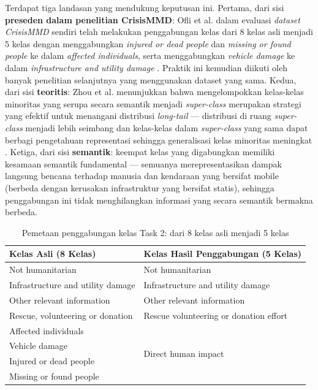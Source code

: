 Terdapat tiga landasan yang mendukung keputusan ini. Pertama, dari
sisi \textbf{preseden dalam penelitian CrisisMMD}: Ofli et al. dalam
evaluasi \textit{dataset} \textit{CrisisMMD} sendiri telah melakukan
penggabungan kelas dari 8 kelas asli menjadi 5 kelas dengan
menggabungkan \textit{injured or dead people} dan \textit{missing or
found people} ke dalam \textit{affected individuals}, serta
menggabungkan \textit{vehicle damage} ke dalam \textit{infrastructure
and utility damage} \cite{ofli2020analysis}. Praktik ini kemudian
diikuti oleh banyak penelitian selanjutnya yang menggunakan dataset
yang sama. Kedua, dari sisi \textbf{teoritis}: Zhou et al. menunjukkan
bahwa mengelompokkan kelas-kelas minoritas yang serupa secara semantik
menjadi \textit{super-class} merupakan strategi yang efektif untuk
menangani distribusi \textit{long-tail} — distribusi di ruang
\textit{super-class} menjadi lebih seimbang dan kelas-kelas dalam
\textit{super-class} yang sama dapat berbagi pengetahuan representasi
sehingga generalisasi kelas minoritas meningkat \cite{zhou2018superclass}.
Ketiga, dari sisi \textbf{semantik}: keempat kelas yang digabungkan
memiliki kesamaan semantik fundamental — semuanya merepresentasikan
dampak langsung bencana terhadap manusia dan kendaraan yang bersifat
mobile (berbeda dengan kerusakan infrastruktur yang bersifat statis),
sehingga penggabungan ini tidak menghilangkan informasi yang secara
semantik bermakna berbeda. \par

\begin{table}[h]
    \centering
    \caption{Pemetaan penggabungan kelas Task 2: dari 8 kelas asli
    menjadi 5 kelas}
    \label{table:crisismmd_task2_merge}
    \begin{tabular}{|l|l|}
        \hline
        \textbf{Kelas Asli (8 Kelas)} &
        \textbf{Kelas Hasil Penggabungan (5 Kelas)} \\
        \hline
        Not humanitarian                    & Not humanitarian \\
        Infrastructure and utility damage   & Infrastructure and utility damage \\
        Other relevant information          & Other relevant information \\
        Rescue, volunteering or donation    & Rescue volunteering or donation effort \\
        Affected individuals                & \multirow{4}{*}{Direct human impact} \\
        Vehicle damage                      & \\
        Injured or dead people              & \\
        Missing or found people             & \\
        \hline
    \end{tabular}
\end{table}

